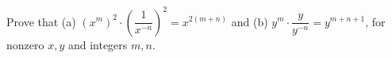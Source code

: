 Prove that (a) $\left(x^m\right)^2\cdot\left(\dfrac1{x^{-n}}\right)^2=x^{2(m+n)}$ and (b) $y^m\cdot\dfrac{y}{y^{-n}}=y^{m+n+1}$, for nonzero $x,y$ and integers $m,n$.
